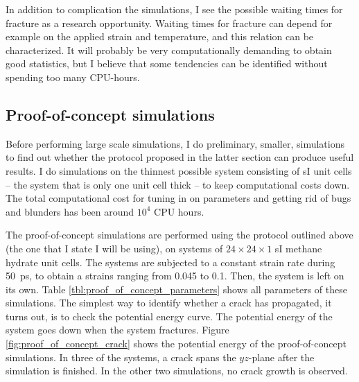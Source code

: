 In addition to complication the simulations, I see the possible waiting times for fracture as a research opportunity. Waiting times for fracture can depend for example on the applied strain and temperature, and this relation can be characterized. It will probably be very computationally demanding to obtain good statistics, but I believe that some tendencies can be identified without spending too many CPU-hours.

\subsection{Proof-of-concept simulations}
Before performing large scale simulations, I do preliminary, smaller, simulations to find out whether the protocol proposed in the latter section can produce useful results. I do simulations on the thinnest possible system consisting of sI unit cells -- the system that is only one unit cell thick -- to keep computational costs down. The total computational cost for tuning in on parameters and getting rid of bugs and blunders has been around $10^4$ CPU hours.

The proof-of-concept simulations are performed using the protocol outlined above (the one that I state I will be using), on systems of $24\times 24\times 1$ sI methane hydrate unit cells. The systems are subjected to a constant strain rate during \SI{50}{\pico\second}, to obtain a strains ranging from 0.045 to 0.1. Then, the system is left on its own. Table \ref{tbl:proof_of_concept_parameters} shows all parameters of these simulations.
The simplest way to identify whether a crack has propagated, it turns out, is to check the potential energy curve. The potential energy of the system goes down when the system fractures. Figure \ref{fig:proof_of_concept_crack} shows the potential energy of the proof-of-concept simulations. In three of the systems, a crack spans the $yz$-plane after the simulation is finished. In the other two simulations, no crack growth is observed.


